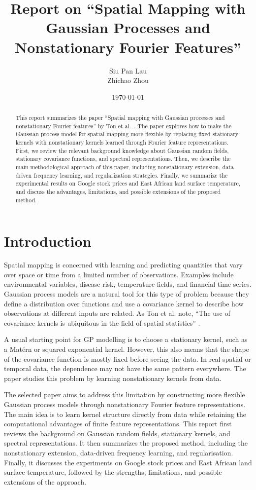\documentclass[11pt,a4paper]{article}
\title{\textbf{Report on ``Spatial Mapping with Gaussian Processes and Nonstationary Fourier Features''}}
\author{
  Siu Pan Lau \\
  Zhichao Zhou
}
\date{\today}
\begin{document}
\maketitle

\begin{abstract}
This report summarizes the paper ``Spatial mapping with Gaussian processes and nonstationary Fourier features'' by Ton et al.~\citep{ton2018spatial}. The paper explores how to make the Gaussian process model for spatial mapping more flexible by replacing fixed stationary kernels with nonstationary kernels learned through Fourier feature representations. First, we review the relevant background knowledge about Gaussian random fields, stationary covariance functions, and spectral representations. Then, we describe the main methodological approach of this paper, including nonstationary extension, data-driven frequency learning, and regularization strategies. Finally, we summarize the experimental results on Google stock prices and East African land surface temperature, and discuss the advantages, limitations, and possible extensions of the proposed method.
\end{abstract}

\section{Introduction}

Spatial mapping is concerned with learning and predicting quantities that vary
over space or time from a limited number of observations. Examples include
environmental variables, disease risk, temperature fields, and financial time
series. Gaussian process models are a natural tool for this type of problem
because they define a distribution over functions and use a covariance kernel to
describe how observations at different inputs are related. As Ton et al. note,
``The use of covariance kernels is ubiquitous in the field of spatial
statistics'' \citep[p.~59]{ton2018spatial}.

A usual starting point for GP modelling is to choose a stationary kernel, such as
a Mat\'ern or squared exponential kernel. However, this also means that the shape
of the covariance function is mostly fixed before seeing the data. In real spatial
or temporal data, the dependence may not have the same pattern everywhere. The
paper studies this problem by learning nonstationary kernels from data.

The selected paper aims to address this limitation by constructing more flexible
Gaussian process models through nonstationary Fourier feature representations.
The main idea is to learn kernel structure directly from data while retaining the
computational advantages of finite feature representations. This report first
reviews the background on Gaussian random fields, stationary kernels, and
spectral representations. It then summarizes the proposed method, including the
nonstationary extension, data-driven frequency learning, and regularisation.
Finally, it discusses the experiments on Google stock prices and East African
land surface temperature, followed by the strengths, limitations, and possible
extensions of the approach.
\end{document}
